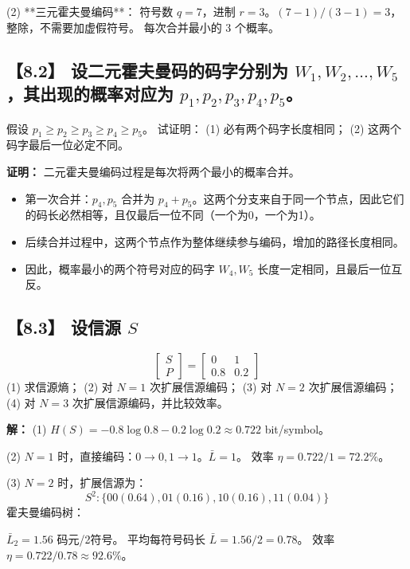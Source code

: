 \documentclass[11pt, a4paper]{article}
\begin{document}
(2) **三元霍夫曼编码**：
符号数 $q=7$，进制 $r=3$。$(7-1)/(3-1) = 3$，整除，不需要加虚假符号。
每次合并最小的 3 个概率。

\subsection*{【8.2】 设二元霍夫曼码的码字分别为 $W_1, W_2, \dots, W_5$，其出现的概率对应为 $p_1, p_2, p_3, p_4, p_5$。}
假设 $p_1 \ge p_2 \ge p_3 \ge p_4 \ge p_5$。
试证明：
(1) 必有两个码字长度相同；
(2) 这两个码字最后一位必定不同。

\textbf{证明：}
二元霍夫曼编码过程是每次将两个最小的概率合并。
\begin{itemize}
    \item 第一次合并：$p_4, p_5$ 合并为 $p_4+p_5$。这两个分支来自于同一个节点，因此它们的码长必然相等，且仅最后一位不同（一个为0，一个为1）。
    \item 后续合并过程中，这两个节点作为整体继续参与编码，增加的路径长度相同。
    \item 因此，概率最小的两个符号对应的码字 $W_4, W_5$ 长度一定相同，且最后一位互反。
\end{itemize}

\subsection*{【8.3】 设信源 $S$}
\[ \begin{bmatrix} S \\ P \end{bmatrix} = \begin{bmatrix} 0 & 1 \\ 0.8 & 0.2 \end{bmatrix} \]
(1) 求信源熵；
(2) 对 $N=1$ 次扩展信源编码；
(3) 对 $N=2$ 次扩展信源编码；
(4) 对 $N=3$ 次扩展信源编码，并比较效率。

\textbf{解：}
(1) $H(S) = -0.8\log 0.8 - 0.2\log 0.2 \approx 0.722$ bit/symbol。

(2) $N=1$ 时，直接编码：$0 \to 0, 1 \to 1$。$\bar{L}=1$。
效率 $\eta = 0.722/1 = 72.2\%$。

(3) $N=2$ 时，扩展信源为：
\[ S^2: \{00(0.64), 01(0.16), 10(0.16), 11(0.04)\} \]
霍夫曼编码树：
\begin{center}
\end{center}
$\bar{L}_2 = 1.56$ 码元/2符号。
平均每符号码长 $\bar{L} = 1.56/2 = 0.78$。
效率 $\eta = 0.722/0.78 \approx 92.6\%$。
\end{document}
